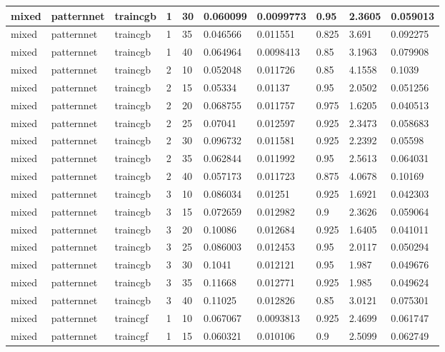 \begin{longtable}{lllllllll}
mixed & patternnet & traincgb & 1 & 30 & 0.060099 & 0.0099773 & 0.95 & 2.3605 & 0.059013 \\ \hline 
mixed & patternnet & traincgb & 1 & 35 & 0.046566 & 0.011551 & 0.825 & 3.691 & 0.092275 \\ \hline 
mixed & patternnet & traincgb & 1 & 40 & 0.064964 & 0.0098413 & 0.85 & 3.1963 & 0.079908 \\ \hline 
mixed & patternnet & traincgb & 2 & 10 & 0.052048 & 0.011726 & 0.85 & 4.1558 & 0.1039 \\ \hline 
mixed & patternnet & traincgb & 2 & 15 & 0.05334 & 0.01137 & 0.95 & 2.0502 & 0.051256 \\ \hline 
mixed & patternnet & traincgb & 2 & 20 & 0.068755 & 0.011757 & 0.975 & 1.6205 & 0.040513 \\ \hline 
mixed & patternnet & traincgb & 2 & 25 & 0.07041 & 0.012597 & 0.925 & 2.3473 & 0.058683 \\ \hline 
mixed & patternnet & traincgb & 2 & 30 & 0.096732 & 0.011581 & 0.925 & 2.2392 & 0.05598 \\ \hline 
mixed & patternnet & traincgb & 2 & 35 & 0.062844 & 0.011992 & 0.95 & 2.5613 & 0.064031 \\ \hline 
mixed & patternnet & traincgb & 2 & 40 & 0.057173 & 0.011723 & 0.875 & 4.0678 & 0.10169 \\ \hline 
mixed & patternnet & traincgb & 3 & 10 & 0.086034 & 0.01251 & 0.925 & 1.6921 & 0.042303 \\ \hline 
mixed & patternnet & traincgb & 3 & 15 & 0.072659 & 0.012982 & 0.9 & 2.3626 & 0.059064 \\ \hline 
mixed & patternnet & traincgb & 3 & 20 & 0.10086 & 0.012684 & 0.925 & 1.6405 & 0.041011 \\ \hline 
mixed & patternnet & traincgb & 3 & 25 & 0.086003 & 0.012453 & 0.95 & 2.0117 & 0.050294 \\ \hline 
mixed & patternnet & traincgb & 3 & 30 & 0.1041 & 0.012121 & 0.95 & 1.987 & 0.049676 \\ \hline 
mixed & patternnet & traincgb & 3 & 35 & 0.11668 & 0.012771 & 0.925 & 1.985 & 0.049624 \\ \hline 
mixed & patternnet & traincgb & 3 & 40 & 0.11025 & 0.012826 & 0.85 & 3.0121 & 0.075301 \\ \hline 
mixed & patternnet & traincgf & 1 & 10 & 0.067067 & 0.0093813 & 0.925 & 2.4699 & 0.061747 \\ \hline 
mixed & patternnet & traincgf & 1 & 15 & 0.060321 & 0.010106 & 0.9 & 2.5099 & 0.062749 \\ \hline 

\end{longtable}
